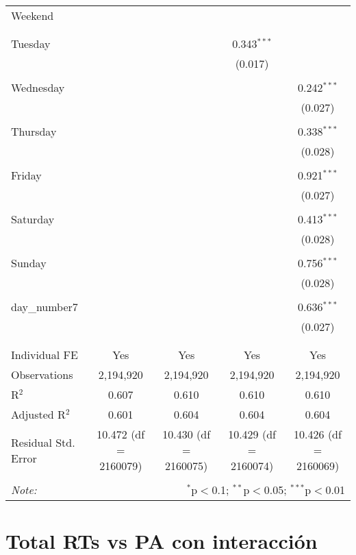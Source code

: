 \documentclass[
]{article}
\begin{document}
\begin{table}[!htbp]
{\begin{tabular}{@{\extracolsep{5pt}}lcccc}
 Weekend &  &  &  &  \\ 
  &  &  &  &  \\ 
  & & & & \\ 
 Tuesday &  &  & 0.343$^{***}$ &  \\ 
  &  &  & (0.017) &  \\ 
  & & & & \\ 
 Wednesday &  &  &  & 0.242$^{***}$ \\ 
  &  &  &  & (0.027) \\ 
  & & & & \\ 
 Thursday &  &  &  & 0.338$^{***}$ \\ 
  &  &  &  & (0.028) \\ 
  & & & & \\ 
 Friday &  &  &  & 0.921$^{***}$ \\ 
  &  &  &  & (0.027) \\ 
  & & & & \\ 
 Saturday &  &  &  & 0.413$^{***}$ \\ 
  &  &  &  & (0.028) \\ 
  & & & & \\ 
 Sunday &  &  &  & 0.756$^{***}$ \\ 
  &  &  &  & (0.028) \\ 
  & & & & \\ 
 day\_number7 &  &  &  & 0.636$^{***}$ \\ 
  &  &  &  & (0.027) \\ 
  & & & & \\ 
\hline \\[-1.8ex] 
Individual FE & Yes & Yes & Yes & Yes \\ 
Observations & 2,194,920 & 2,194,920 & 2,194,920 & 2,194,920 \\ 
R$^{2}$ & 0.607 & 0.610 & 0.610 & 0.610 \\ 
Adjusted R$^{2}$ & 0.601 & 0.604 & 0.604 & 0.604 \\ 
Residual Std. Error & 10.472 (df = 2160079) & 10.430 (df = 2160075) & 10.429 (df = 2160074) & 10.426 (df = 2160069) \\ 
\hline 
\hline \\[-1.8ex] 
\textit{Note:}  & \multicolumn{4}{r}{$^{*}$p$<$0.1; $^{**}$p$<$0.05; $^{***}$p$<$0.01} \\ 
\end{tabular}
} 
\end{table} 
\newpage
\section{Total RTs vs PA con interacción}
\end{document}
